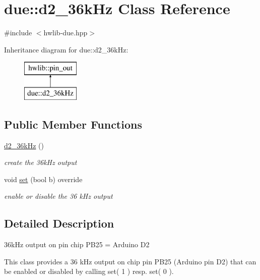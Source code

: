 \hypertarget{classdue_1_1d2__36k_hz}{}\section{due\+:\+:d2\+\_\+36k\+Hz Class Reference}
\label{classdue_1_1d2__36k_hz}


{\ttfamily \#include $<$hwlib-\/due.\+hpp$>$}

Inheritance diagram for due\+:\+:d2\+\_\+36k\+Hz\+:\begin{figure}[H]
\begin{center}
\leavevmode
\includegraphics[height=2.000000cm]{classdue_1_1d2__36k_hz}
\end{center}
\end{figure}
\subsection*{Public Member Functions}
\begin{DoxyCompactItemize}
\item 
\hyperlink{classdue_1_1d2__36k_hz_a9172955a5667b99410897e2cabed24d2}{d2\+\_\+36k\+Hz} ()\hypertarget{classdue_1_1d2__36k_hz_a9172955a5667b99410897e2cabed24d2}{}\label{classdue_1_1d2__36k_hz_a9172955a5667b99410897e2cabed24d2}

\begin{DoxyCompactList}\small\item\em create the 36k\+Hz output \end{DoxyCompactList}\item 
void \hyperlink{classdue_1_1d2__36k_hz_abdb0b8ee44017ecfaf37fcbf9e0ba126}{set} (bool b) override
\begin{DoxyCompactList}\small\item\em enable or disable the 36 k\+Hz output \end{DoxyCompactList}\end{DoxyCompactItemize}


\subsection{Detailed Description}
36k\+Hz output on pin chip P\+B25 = Arduino D2

This class provides a 36 k\+Hz output on chip pin P\+B25 (Arduino pin D2) that can be enabled or disabled by calling set( 1 ) resp. set( 0 ). 

